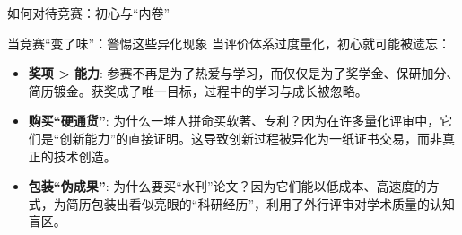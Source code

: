 \documentclass{beamer}
\begin{document}
\begin{frame}{如何对待竞赛：初心与“内卷”}


    \begin{alertblock}{当竞赛“变了味”：警惕这些异化现象}
        当评价体系过度量化，初心就可能被遗忘：
        \begin{itemize}
            \item \textbf{奖项 > 能力}: 参赛不再是为了热爱与学习，而仅仅是为了\alert{奖学金、保研加分、简历镀金}。获奖成了唯一目标，过程中的学习与成长被忽略。
            
            \item \textbf{购买“硬通货”}: 为什么一堆人拼命买软著、专利？因为在许多量化评审中，它们是“创新能力”的直接证明。这导致\alert{创新过程被异化为一纸证书交易}，而非真正的技术创造。
            
            \item \textbf{包装“伪成果”}: 为什么要买“水刊”论文？因为它们能以低成本、高速度的方式，为简历包装出看似亮眼的“科研经历”，利用了\alert{外行评审对学术质量的认知盲区}。
        \end{itemize}
    \end{alertblock}
    
    \vfill
\end{frame}
\end{document}

